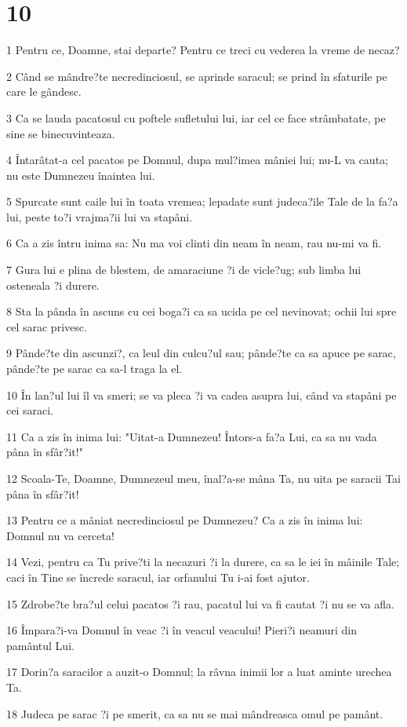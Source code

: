 \chapter{10}

\par 1 Pentru ce, Doamne, stai departe? Pentru ce treci cu vederea la vreme de necaz?
\par 2 Când se mândre?te necredinciosul, se aprinde saracul; se prind în sfaturile pe care le gândesc.
\par 3 Ca se lauda pacatosul cu poftele sufletului lui, iar cel ce face strâmbatate, pe sine se binecuvinteaza.
\par 4 Întarâtat-a cel pacatos pe Domnul, dupa mul?imea mâniei lui; nu-L va cauta; nu este Dumnezeu înaintea lui.
\par 5 Spurcate sunt caile lui în toata vremea; lepadate sunt judeca?ile Tale de la fa?a lui, peste to?i vrajma?ii lui va stapâni.
\par 6 Ca a zis întru inima sa: Nu ma voi clinti din neam în neam, rau nu-mi va fi.
\par 7 Gura lui e plina de blestem, de amaraciune ?i de vicle?ug; sub limba lui osteneala ?i durere.
\par 8 Sta la pânda în ascuns cu cei boga?i ca sa ucida pe cel nevinovat; ochii lui spre cel sarac privesc.
\par 9 Pânde?te din ascunzi?, ca leul din culcu?ul sau; pânde?te ca sa apuce pe sarac, pânde?te pe sarac ca sa-l traga la el.
\par 10 În lan?ul lui îl va smeri; se va pleca ?i va cadea asupra lui, când va stapâni pe cei saraci.
\par 11 Ca a zis în inima lui: "Uitat-a Dumnezeu! Întors-a fa?a Lui, ca sa nu vada pâna în sfâr?it!"
\par 12 Scoala-Te, Doamne, Dumnezeul meu, înal?a-se mâna Ta, nu uita pe saracii Tai pâna în sfâr?it!
\par 13 Pentru ce a mâniat necredinciosul pe Dumnezeu? Ca a zis în inima lui: Domnul nu va cerceta!
\par 14 Vezi, pentru ca Tu prive?ti la necazuri ?i la durere, ca sa le iei în mâinile Tale; caci în Tine se încrede saracul, iar orfanului Tu i-ai fost ajutor.
\par 15 Zdrobe?te bra?ul celui pacatos ?i rau, pacatul lui va fi cautat ?i nu se va afla.
\par 16 Împara?i-va Domnul în veac ?i în veacul veacului! Pieri?i neamuri din pamântul Lui.
\par 17 Dorin?a saracilor a auzit-o Domnul; la râvna inimii lor a luat aminte urechea Ta.
\par 18 Judeca pe sarac ?i pe smerit, ca sa nu se mai mândreasca omul pe pamânt.

